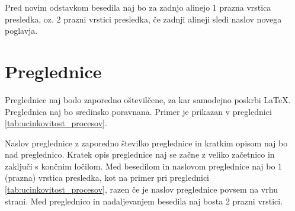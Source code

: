 Pred novim odstavkom besedila naj bo za zadnjo alinejo 1 prazna vrstica 
presledka, oz. 2 prazni vrstici presledka, če zadnji alineji sledi naslov 
novega poglavja.

\section{Preglednice}\label{sec:preglednice}

Preglednice naj bodo zaporedno oštevilčene, za kar samodejno poskrbi \LaTeX. 
Preglednica naj bo sredinsko poravnana. Primer je prikazan v preglednici 
\ref{tab:ucinkovitost_procesov}.

Naslov preglednice z zaporedno številko preglednice in kratkim opisom naj bo 
nad preglednico. Kratek opis preglednice naj se začne z veliko začetnico in 
zaključi s končnim ločilom. Med besedilom in naslovom preglednice naj bo 1 
(prazna) vrstica presledka, kot na primer pri preglednici 
\ref{tab:ucinkovitost_procesov}, razen če je naslov preglednice povsem na vrhu 
strani. Med preglednico in nadaljevanjem besedila naj bosta 2 prazni vrstici.

